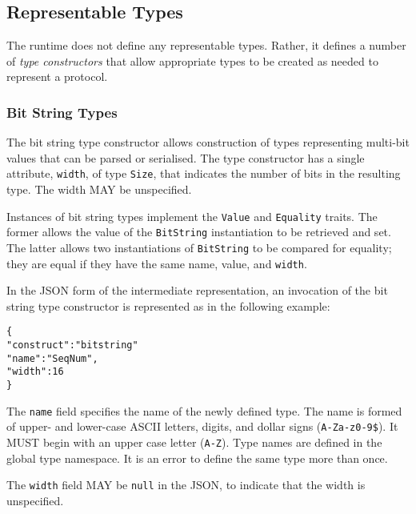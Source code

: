 \documentclass[10pt,twocolumn,a4paper]{article}
\newcommand{\code}[1]{\texttt{#1}}
\begin{document}
\subsection{Representable Types}
\label{sec:representable}

The runtime does not define any representable types. Rather, it defines
a number of \emph{type constructors} that allow appropriate types to be
created as needed to represent a protocol.

\subsubsection{Bit String Types}
\label{sec:bit-string}

The bit string type constructor allows construction of types representing
multi-bit values that can be parsed or serialised. The type constructor
has a single attribute, \code{width}, of type \code{Size}, that indicates
the number of bits in the resulting type. The width MAY be unspecified.

Instances of bit string types implement the \code{Value} and
\code{Equality} traits. The former allows the value of the \code{BitString}
instantiation to be retrieved and set. The latter allows two instantiations
of \code{BitString} to be compared for equality; they are equal if they
have the same name, value, and \code{width}.

In the JSON form of the intermediate representation, an invocation of the
bit string type constructor is represented as in the following example:
\footnotesize
\begin{alltt}
  \{
    "construct"   : "bitstring"
    "name"        : "SeqNum",
    "width"       : 16
  \}
\end{alltt}
\normalsize
The \code{name} field specifies the name of the newly defined type. The
name is formed of upper- and lower-case ASCII letters, digits, and dollar
signs (\code{A-Za-z0-9\$}).  It MUST begin with an upper case letter
(\code{A-Z}). Type names are defined in the global type namespace. 
It is an error to define the same type more than once.

The \code{width} field MAY be \code{null} in the JSON, to indicate that the
width is unspecified.

\end{document}
